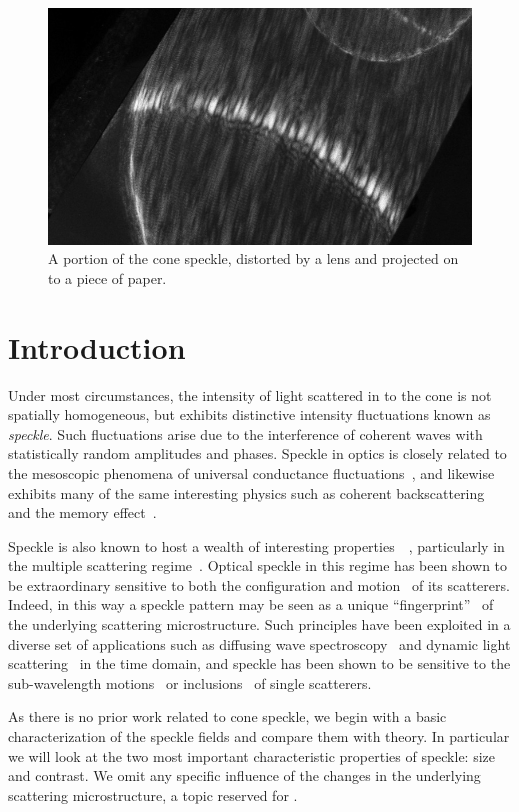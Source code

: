 \begin{figure}[ht]
\centering
\includegraphics[keepaspectratio,width=15cm]{speckle/figures/Ag_LaSFN9_cone_lens11_cam-8899.jpg}
\caption{A portion of the cone speckle, distorted by a lens and projected on to a piece of paper.}
\label{fig:examplespeckle}
\end{figure}
\section{Introduction}
Under most circumstances, the intensity of light scattered in to the cone
is not spatially homogeneous, but exhibits distinctive intensity
fluctuations known as \textit{speckle}.  Such fluctuations arise due to the
interference of coherent waves with statistically random amplitudes and
phases.  Speckle in optics is closely related to the mesoscopic phenomena
of universal conductance fluctuations~\cite{lee1985universal}, and likewise
exhibits many of the same interesting physics such as coherent
backscattering~\cite{akkermans1986coherent} and the memory
effect~\cite{freund1988memory}.

Speckle is also known to host a wealth of interesting
properties~\cite{goodman1975statistical}~\cite{freund19981001},
particularly in the multiple scattering regime~\cite{feng1986sensitivity}.
Optical speckle in this regime has been shown to be extraordinary sensitive
to both the configuration and motion~\cite{berkovits1994correlations} of
its scatterers.  Indeed, in this way a speckle pattern may be seen as a
unique ``fingerprint''~\cite{ravikanth2001physical} of the underlying
scattering microstructure.  Such principles have been exploited in a
diverse set of applications such as diffusing wave
spectroscopy~\cite{pine1988diffusing} and dynamic light
scattering~\cite{berne2000dynamic} in the time domain, and speckle has been
shown to be sensitive to the sub-wavelength
motions~\cite{berkovits1991sensitivity} or
inclusions~\cite{berkovits1990theory} of single scatterers.

As there is no prior work related to cone speckle, we begin with a basic
characterization of the speckle fields and compare them with theory.  In
particular we will look at the two most important characteristic properties
of speckle: size and contrast.  We omit any specific influence of the
changes in the underlying scattering microstructure, a topic reserved for
.

